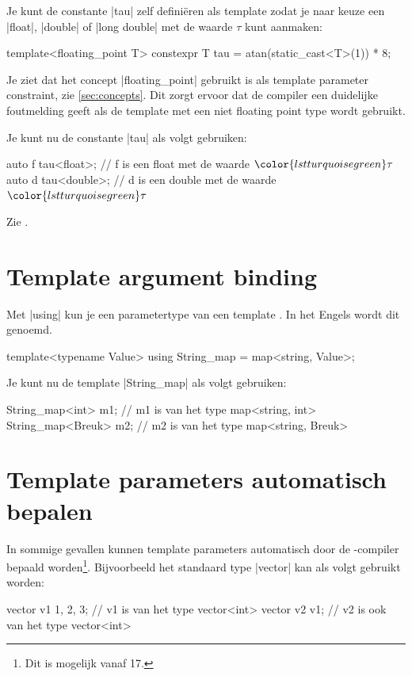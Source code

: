\begin{cpplstShortInline}
Je kunt de constante |tau| zelf definiëren als template zodat je naar keuze een |float|, |double| of |long double| met de waarde $\tau$ kunt aanmaken:
\begin{cpplstfragment}
template<floating_point T> constexpr T tau = atan(static_cast<T>(1)) * 8;
\end{cpplstfragment}
Je ziet dat het concept |floating_point| gebruikt is als template parameter constraint, zie \cref{sec:concepts}.
Dit zorgt ervoor dat de compiler een duidelijke foutmelding geeft als de template met een niet floating point type wordt gebruikt.

Je kunt nu de constante |tau| als volgt gebruiken:
\begin{cpplstfragment}[mathescape=true]
auto f {tau<float>}; // f is een float met de waarde $\color{lstturquoisegreen}\tau$
auto d {tau<double>}; // d is een double met de waarde $\color{lstturquoisegreen}\tau$
\end{cpplstfragment}
Zie .

\section{Template argument binding}
\label{sec:templateargumentbinding}
Met |using| kun je een parametertype van een template .
In het Engels wordt dit \emph{} genoemd. 
\begin{cpplstfragment}
template<typename Value> using String_map = map<string, Value>;
\end{cpplstfragment}

Je kunt nu de template |String_map| als volgt gebruiken:
	
\begin{cpplstfragment}
String_map<int> m1; // m1 is van het type map<string, int>
String_map<Breuk> m2; // m2 is van het type map<string, Breuk>
\end{cpplstfragment}

\section{Template parameters automatisch bepalen}
In sommige gevallen kunnen template parameters automatisch door de \Cpp{}\hyp{}compiler bepaald worden\footnote{%
	Dit is mogelijk vanaf \Cpp{}17.
}.
Bijvoorbeeld het standaard type |vector| kan als volgt gebruikt worden:
\begin{cpplstfragment}
	vector v1 {1, 2, 3}; // v1 is van het type vector<int>
	vector v2 {v1}; // v2 is ook van het type vector<int>
\end{cpplstfragment}


\end{cpplstShortInline}

